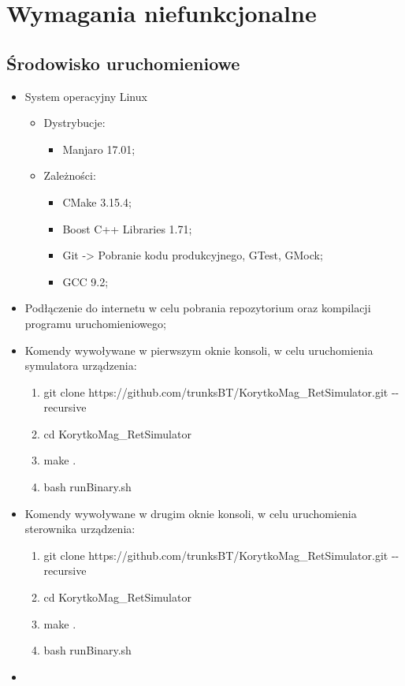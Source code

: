 \chapter{Wymagania niefunkcjonalne}
\section{Środowisko uruchomieniowe}
	\begin{itemize}
		\item System operacyjny Linux
			\begin{itemize}
				\item Dystrybucje:
				\begin{itemize}
					\item Manjaro 17.01;
				\end{itemize}
				\item Zależności:
					\begin{itemize}
						\item CMake 3.15.4;
						\item Boost C++ Libraries 1.71;
						\item Git -> Pobranie kodu produkcyjnego, GTest, GMock;
						\item GCC 9.2;
					\end{itemize}
			\end{itemize}
		\item Podłączenie do internetu w celu pobrania repozytorium oraz kompilacji programu uruchomieniowego;
		\item Komendy wywoływane w pierwszym oknie konsoli, w celu uruchomienia symulatora urządzenia:
		\begin{enumerate}
			\item git clone https://github.com/trunksBT/KorytkoMag\_RetSimulator.git -{}-recursive
			\item cd KorytkoMag\_RetSimulator
			\item make .
			\item bash runBinary.sh
		\end{enumerate}
		\item Komendy wywoływane w drugim oknie konsoli, w celu uruchomienia sterownika urządzenia:
		\begin{enumerate}
			\item git clone https://github.com/trunksBT/KorytkoMag\_RetSimulator.git -{}-recursive
			\item cd KorytkoMag\_RetSimulator
			\item make .
			\item bash runBinary.sh
		\end{enumerate}
		\item 
	\end{itemize}

